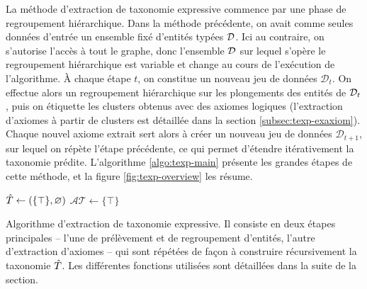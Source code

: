 La méthode d'extraction de taxonomie expressive commence par une phase de regroupement hiérarchique. Dans la méthode précédente, on avait comme seules données d'entrée un ensemble fixé d'entités typées $\cal{D}$. Ici au contraire, on s'autorise l'accès à tout le graphe, donc l'ensemble $\cal{D}$ sur lequel s'opère le regroupement hiérarchique est variable et change au cours de l'exécution de l'algorithme. À chaque étape $t$, on constitue un nouveau jeu de données $\mathcal{D}_t$.
On effectue alors un regroupement hiérarchique sur les plongements des entités de $\cal{D}_t$, puis on étiquette les clusters obtenus avec des axiomes logiques (l'extraction d'axiomes à partir de clusters est détaillée dans la section \ref{subsec:texp-exaxiom}). Chaque nouvel axiome extrait sert alors à créer un nouveau jeu de données $\mathcal{D}_{t+1}$, sur lequel on répète l'étape précédente, ce qui permet d'étendre itérativement la taxonomie prédite. L'algorithme \ref{algo:texp-main} présente les grandes étapes de cette méthode, et la figure \ref{fig:texp-overview} les résume.



\begin{algorithm}[ht]

$\Tpred \leftarrow  (\{ \top \}, \varnothing)$ \;
$\mathcal{AT} \leftarrow \{ \top \}$\;

\caption{Algorithme d'extraction de taxonomie expressive. Il consiste en deux étapes principales – l'une de prélèvement et de regroupement d'entités, l'autre d'extraction d'axiomes – qui sont répétées de façon à construire récursivement la taxonomie $\Tpred$. Les différentes fonctions utilisées sont détaillées dans la suite de la section.}
\label{algo:texp-main}
\end{algorithm}



